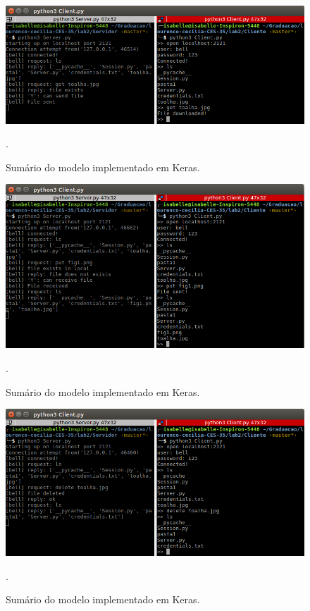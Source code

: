 \documentclass[conference]{IEEEtran}
\begin{document}
\begin{figure}[htbp]
\centering
\centerline{\includegraphics[scale=0.3]{prints/get1.png}}
\caption{Sumário do modelo implementado em Keras.}.
\label{summary}
\end{figure}

\begin{figure}[htbp]
\centering
\centerline{\includegraphics[scale=0.3]{prints/put1.png}}
\caption{Sumário do modelo implementado em Keras.}.
\label{summary}
\end{figure}

\begin{figure}[htbp]
\centering
\centerline{\includegraphics[scale=0.3]{prints/delete1.png}}
\caption{Sumário do modelo implementado em Keras.}.
\label{summary}
\end{figure}
\end{document}
